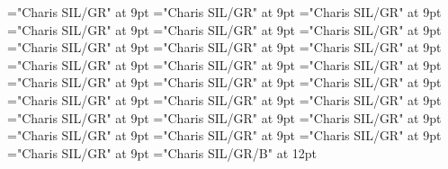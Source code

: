 \documentclass[gps1,twoside]{article}
\begin{document}
\font\spanspanabbreviationsemanticdomainsemanticdomainssensesensesentrybefore="Charis SIL/GR" at 9pt
\font\spanabbreviationsemanticdomainsemanticdomainssensesensesentrylastchildafter="Charis SIL/GR" at 9pt
\font\spanspannamesemanticdomainsemanticdomainssensesensesentrybefore="Charis SIL/GR" at 9pt
\font\academicdomainacademicdomainacademicdomainssensesensesentrybefore="Charis SIL/GR" at 9pt
\font\academicdomainssensesensesentrybefore="Charis SIL/GR" at 9pt
\font\academicdomainssensesensesentryafter="Charis SIL/GR" at 9pt
\font\spanspanabbreviationacademicdomainacademicdomainssensesensesentrybefore="Charis SIL/GR" at 9pt
\font\spanspannameacademicdomainacademicdomainssensesensesentrybefore="Charis SIL/GR" at 9pt
\font\spannameacademicdomainacademicdomainssensesensesentryfirstchildbefore="Charis SIL/GR" at 9pt
\font\spannameacademicdomainacademicdomainssensesensesentrylastchildafter="Charis SIL/GR" at 9pt
\font\usageusageusagessensesensesentrybefore="Charis SIL/GR" at 9pt
\font\usagessensesensesentrybefore="Charis SIL/GR" at 9pt
\font\usagessensesensesentryafter="Charis SIL/GR" at 9pt
\font\spanspanabbreviationusageusagessensesensesentrybefore="Charis SIL/GR" at 9pt
\font\complexformsnotsubentrycomplexformsnotsubentrycomplexformsnotsubentriessensesensesentrybefore="Charis SIL/GR" at 9pt
\font\complexformsnotsubentriessensesensesentryafter="Charis SIL/GR" at 9pt
\font\complexformtypescomplexformsnotsubentrycomplexformsnotsubentriessensesensesentryafter="Charis SIL/GR" at 9pt
\font\spanspanreverseabbrcomplexformtypecomplexformtypescomplexformsnotsubentrycomplexformsnotsubentriessensesensesentrybefore="Charis SIL/GR" at 9pt
\font\spanspanheadwordcomplexformsnotsubentrycomplexformsnotsubentriessensesensesentrybefore="Charis SIL/GR" at 9pt
\font\spanspanowningentrysummarydefinitioncomplexformsnotsubentrycomplexformsnotsubentriessensesensesentrybefore="Charis SIL/GR" at 9pt
\font\spanowningentrysummarydefinitioncomplexformsnotsubentrycomplexformsnotsubentriessensesensesentryfirstchildbefore="Charis SIL/GR" at 9pt
\font\spanowningentrysummarydefinitioncomplexformsnotsubentrycomplexformsnotsubentriessensesensesentrylastchildafter="Charis SIL/GR" at 9pt
\font\nontrivialentryrootnontrivialentryrootnontrivialentryrootscomplexformsnotsubentrycomplexformsnotsubentriessensesensesentrybefore="Charis SIL/GR" at 9pt
\font\nontrivialentryrootscomplexformsnotsubentrycomplexformsnotsubentriessensesensesentrybefore="Charis SIL/GR" at 9pt
\font\nontrivialentryrootscomplexformsnotsubentrycomplexformsnotsubentriessensesensesentryafter="Charis SIL/GR" at 9pt
\font\nontrivialentryrootnontrivialentryrootscomplexformsnotsubentrycomplexformsnotsubentriessensesensesentry="Charis SIL/GR/B" at 12pt
\end{document}

